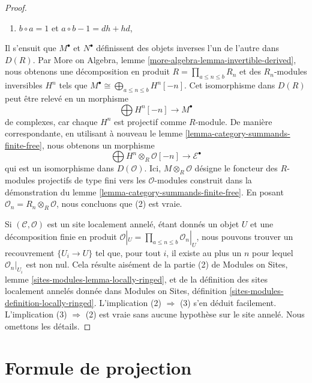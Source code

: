 \begin{proof}
\begin{enumerate}
\item $b \circ a = 1$ et $a \circ b - 1 = dh + hd$,
\end{enumerate}
Il s'ensuit que $M^\bullet$ et $N^\bullet$ définissent des objets inverses
l'un de l'autre dans $D(R)$. Par More on Algebra, lemme
\ref{more-algebra-lemma-invertible-derived}, nous obtenons une décomposition
en produit $R = \prod_{a \leq n \leq b} R_n$ et des $R_n$-modules inversibles
$H^n$ tels que
$M^\bullet \cong \bigoplus_{a \leq n \leq b} H^n[-n]$. Cet isomorphisme dans
$D(R)$ peut être relevé en un morphisme
$$
\bigoplus H^n[-n] \longrightarrow M^\bullet
$$
de complexes, car chaque $H^n$ est projectif comme $R$-module. De manière
correspondante, en utilisant à nouveau le lemme
\ref{lemma-category-summands-finite-free}, nous obtenons un morphisme
$$
\bigoplus H^n \otimes_R \mathcal{O}[-n] \to \mathcal{E}^\bullet
$$
qui est un isomorphisme dans $D(\mathcal{O})$. Ici,
$M \otimes_R \mathcal{O}$ désigne le foncteur des $R$-modules projectifs de
type fini vers les $\mathcal{O}$-modules construit dans la démonstration du
lemme \ref{lemma-category-summands-finite-free}. En posant
$\mathcal{O}_n = R_n \otimes_R \mathcal{O}$, nous concluons que (2) est vraie.

\medskip\noindent
Si $(\mathcal{C}, \mathcal{O})$ est un site localement annelé, étant donnés
un objet $U$ et une décomposition finie en produit
$\mathcal{O}|_U = \prod_{a \leq n \leq b} \mathcal{O}_n|_U$, nous pouvons
trouver un recouvrement $\{U_i \to U\}$ tel que, pour tout $i$, il existe au
plus un $n$ pour lequel $\mathcal{O}_n|_{U_i}$ est non nul. Cela résulte
aisément de la partie (2) de Modules on Sites, lemme
\ref{sites-modules-lemma-locally-ringed}, et de la définition des sites
localement annelés donnée dans Modules on Sites, définition
\ref{sites-modules-definition-locally-ringed}. L'implication
(2) $\Rightarrow$ (3) s'en déduit facilement. L'implication
(3) $\Rightarrow$ (2) est vraie sans aucune hypothèse sur le site annelé.
Nous omettons les détails.
\end{proof}










\section{Formule de projection}
\label{section-projection-formula}


